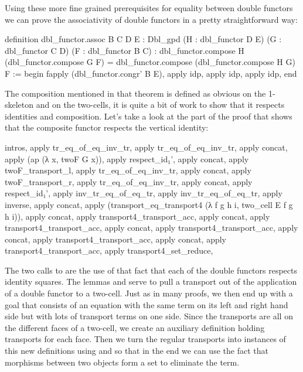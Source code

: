 Using these more fine grained prerequisites for equality between double functors
we can prove the associativity of double functors in a pretty straightforward way:
\begin{leancodebr}
  definition dbl_functor.assoc {B C D E : Dbl_gpd}
    (H : dbl_functor D E) (G : dbl_functor C D) (F : dbl_functor B C) :
    dbl_functor.compose H (dbl_functor.compose G F)
    = dbl_functor.compose (dbl_functor.compose H G) F :=
  begin
    fapply (dbl_functor.congr' B E),
        apply idp,
      apply idp,
    apply idp,
  end
\end{leancodebr}

The composition mentioned in that theorem is defined as obvious on the 1-skeleton
and on the two-cells, it is quite a bit of work to show that it respects
identities and composition.
Let's take a look at the part of the proof that shows that the composite functor
respects the vertical identity:
\begin{leancodebr}
      intros, apply tr_eq_of_eq_inv_tr, apply tr_eq_of_eq_inv_tr,
      apply concat, apply (ap (λ x, twoF G x)), apply respect_id₁',
      apply concat, apply twoF_transport_l, apply tr_eq_of_eq_inv_tr,
      apply concat, apply twoF_transport_r, apply tr_eq_of_eq_inv_tr,
      apply concat, apply respect_id₁',
      apply inv_tr_eq_of_eq_tr, apply inv_tr_eq_of_eq_tr,
      apply inverse,
      apply concat, apply (transport_eq_transport4 (λ f g h i, two_cell E f g h i)),
      apply concat, apply transport4_transport_acc,
      apply concat, apply transport4_transport_acc,
      apply concat, apply transport4_transport_acc,
      apply concat, apply transport4_transport_acc,
      apply concat, apply transport4_transport_acc,
      apply transport4_set_reduce,
\end{leancodebr}
The two calls to  are the use of that fact that each of the
double functors respects identity squares.
The lemmas  and  serve to pull
a transport out of the application of a double functor to a two-cell.
Just as in many proofs, we then end up with a goal that consists of an equation
with the same term on its left and right hand side but with lots of transport
terms on one side.
Since the transports are all on the different faces of a two-cell, we create an
auxiliary definition  holding transports for each face.
Then we turn the regular transports into instances of this new definitions using
 and  so that in the
end we can use the fact that morphisms between two objects form a set to eliminate
the  term.

